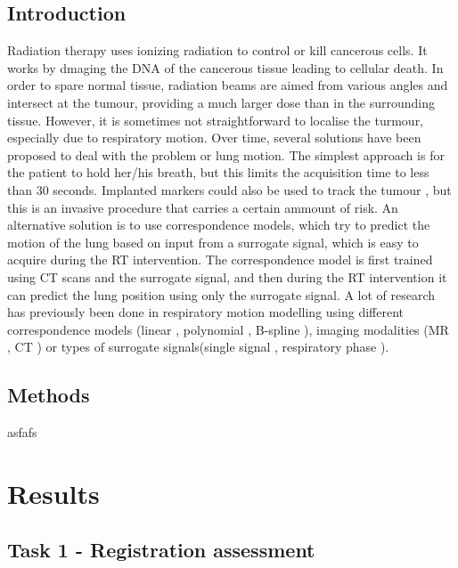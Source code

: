 \documentclass[11pt,a4paper,oneside]{report}
\begin{document}

\subsection*{Introduction}
Radiation therapy uses ionizing radiation to control or kill cancerous cells. It works by dmaging the DNA of the cancerous tissue leading to cellular death. In order to spare normal tissue, radiation beams are aimed from various angles and intersect at the tumour, providing a much larger dose than in the surrounding tissue. However, it is sometimes not straightforward to localise the turmour, especially due to respiratory motion. Over time, several solutions have been proposed to deal with the problem or lung motion. The simplest approach is for the patient to hold her/his breath, but this limits the acquisition time to less than 30 seconds. Implanted markers could also be used to track the tumour \cite{shirato2000physical}, but this is an invasive procedure that carries a certain ammount of risk. 
An alternative solution is to use correspondence models, which try to predict the motion of the lung based on input from a surrogate signal, which is easy to acquire during the RT intervention. The correspondence model is first trained using CT scans and the surrogate signal, and then during the RT intervention it can predict the lung position using only the surrogate signal. A lot of research has previously been done in respiratory motion modelling using different correspondence models (linear \cite{schweikard2000robotic}, polynomial \cite{mcclelland20054d}, B-spline \cite{buerger2012nonrigid}), imaging modalities (MR \cite{manke2003novel}, CT \cite{mcclelland20054d}) or types of surrogate signals(single signal \cite{schweikard2000robotic}, respiratory phase \cite{shechter2004respiratory}).

\subsection*{Methods}
asfafs

\section*{Results}

\subsection*{Task 1 - Registration assessment}
\end{document}

